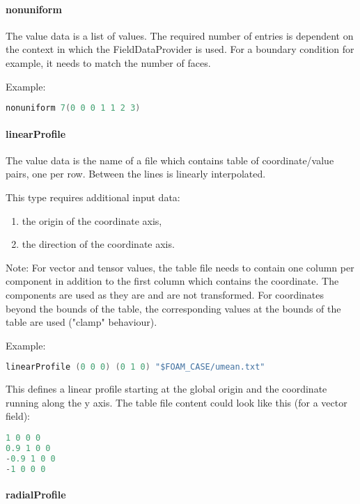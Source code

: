 \paragraph{nonuniform}
The value data is a list of values. 
The required number of entries is dependent on the context in which the FieldDataProvider is used.
For a boundary condition for example, it needs to match the number of faces.

Example:
\begin{lstlisting}[language=c++]
nonuniform 7(0 0 0 1 1 2 3)
\end{lstlisting}

\paragraph{linearProfile}
The value data is the name of a file which contains table of coordinate/value pairs, one per row.
Between the lines is linearly interpolated.

This type requires additional input data:
\begin{enumerate}
\item the origin of the coordinate axis,
\item the direction of the coordinate axis.
\end{enumerate}
Note: For vector and tensor values, the table file needs to contain one column per component in addition to the first column which contains the coordinate.
The components are used as they are and are not transformed.
For coordinates beyond the bounds of the table, the corresponding values at the bounds of the table are used ("clamp" behaviour).

Example:

\begin{lstlisting}[language=c++]
linearProfile (0 0 0) (0 1 0) "$FOAM_CASE/umean.txt"
\end{lstlisting}

This defines a linear profile starting at the global origin and the coordinate running along the y axis.
The table file content could look like this (for a vector field):

\begin{lstlisting}[language=c++]
1 0 0 0
0.9 1 0 0
-0.9 1 0 0
-1 0 0 0
\end{lstlisting}

\paragraph{radialProfile}

